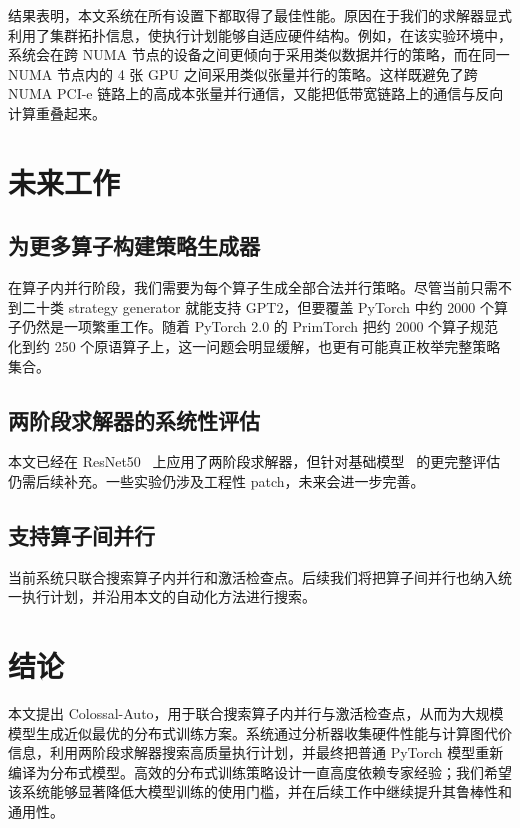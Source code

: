 \documentclass[10pt,letterpaper,twocolumn]{article}
\begin{document}
结果表明，本文系统在所有设置下都取得了最佳性能。原因在于我们的求解器显式利用了集群拓扑信息，使执行计划能够自适应硬件结构。例如，在该实验环境中，系统会在跨 NUMA 节点的设备之间更倾向于采用类似数据并行的策略，而在同一 NUMA 节点内的 4 张 GPU 之间采用类似张量并行的策略。这样既避免了跨 NUMA PCI-e 链路上的高成本张量并行通信，又能把低带宽链路上的通信与反向计算重叠起来。

\section{未来工作}

\subsection{为更多算子构建策略生成器}

在算子内并行阶段，我们需要为每个算子生成全部合法并行策略。尽管当前只需不到二十类 strategy generator 就能支持 GPT2，但要覆盖 PyTorch 中约 2000 个算子仍然是一项繁重工作。随着 PyTorch 2.0 的 PrimTorch 把约 2000 个算子规范化到约 250 个原语算子上，这一问题会明显缓解，也更有可能真正枚举完整策略集合。

\subsection{两阶段求解器的系统性评估}

本文已经在 ResNet50~\cite{he2016deep} 上应用了两阶段求解器，但针对基础模型~\cite{bommasani2021opportunities} 的更完整评估仍需后续补充。一些实验仍涉及工程性 patch，未来会进一步完善。

\subsection{支持算子间并行}

当前系统只联合搜索算子内并行和激活检查点。后续我们将把算子间并行也纳入统一执行计划，并沿用本文的自动化方法进行搜索。

\section{结论}

本文提出 Colossal-Auto，用于联合搜索算子内并行与激活检查点，从而为大规模模型生成近似最优的分布式训练方案。系统通过分析器收集硬件性能与计算图代价信息，利用两阶段求解器搜索高质量执行计划，并最终把普通 PyTorch 模型重新编译为分布式模型。高效的分布式训练策略设计一直高度依赖专家经验；我们希望该系统能够显著降低大模型训练的使用门槛，并在后续工作中继续提升其鲁棒性和通用性。

\newpage

\end{document}
